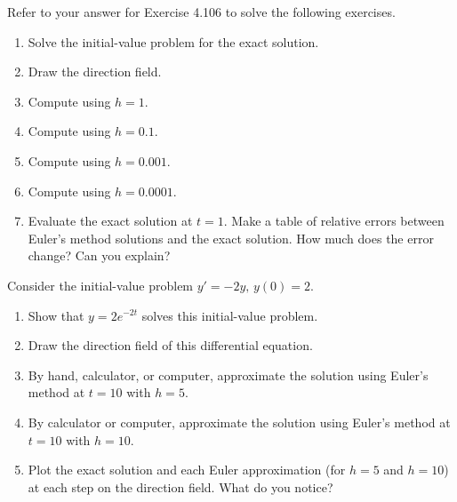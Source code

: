 \documentclass{exercises}
\begin{document}
Refer to your answer for Exercise 4.106 to solve the following exercises.

\begin{enumerate}[resume]
\item Solve the initial-value problem for the exact solution.
\item Draw the direction field.
\item Compute using $h=1$.
\item \techrequired Compute using $h=0.1$.
\item \techrequired Compute using $h=0.001$.
\item \techrequired Compute using $h=0.0001$.
\item \techrequired Evaluate the exact solution at $t=1$. Make a table of relative errors between Euler's method solutions and the exact solution. How much does the error change? Can you explain?
\end{enumerate}

Consider the initial-value problem $y'=-2y,\,y(0)=2$.

\begin{enumerate}[resume]
\item Show that $y=2e^{-2t}$ solves this initial-value problem.
\item Draw the direction field of this differential equation.
\item \techrequired By hand, calculator, or computer, approximate the solution using Euler's method at $t=10$ with $h=5$.
\item \techrequired By calculator or computer, approximate the solution using Euler's method at $t=10$ with $h=10$.
\item \techrequired Plot the exact solution and each Euler approximation (for $h=5$ and $h=10$) at each step on the direction field. What do you notice?
\end{enumerate}
\end{document}
